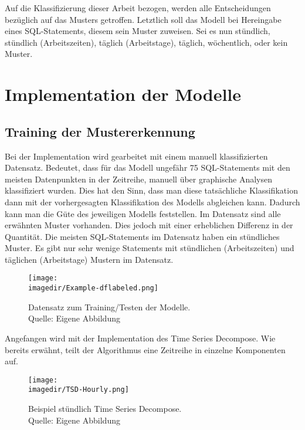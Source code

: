  Auf die Klassifizierung dieser Arbeit bezogen, werden alle Entscheidungen bezüglich auf das Musters getroffen. Letztlich soll das Modell bei Hereingabe eines SQL-Statements, diesem sein Muster zuweisen. Sei es nun stündlich, stündlich (Arbeitszeiten), täglich (Arbeitstage), täglich, wöchentlich, oder kein Muster.

\section{Implementation der Modelle}

\subsection{Training der Mustererkennung}

Bei der Implementation wird gearbeitet mit einem manuell klassifizierten Datensatz. Bedeutet, dass für das Modell ungefähr 75 SQL-Statements mit den meisten Datenpunkten in der Zeitreihe, manuell über graphische Analysen klassifiziert wurden. Dies hat den Sinn, dass man diese tatsächliche Klassifikation dann mit der vorhergesagten Klassifikation des Modells abgleichen kann. Dadurch kann man die Güte des jeweiligen Modells feststellen. Im Datensatz sind alle erwähnten Muster vorhanden. Dies jedoch mit einer erheblichen Differenz in der Quantität. Die meisten SQL-Statements im Datensatz haben ein stündliches Muster. Es gibt nur sehr wenige Statements mit stündlichen (Arbeitszeiten) und täglichen (Arbeitstage) Mustern im Datensatz.

\begin{figure}[H]

	\centering
	\texttt{[image: \\imagedir/Example-dflabeled.png]}
	\captionsetup{format=hang}
	\caption[Datensatz zum Training/Testen der Modelle]{\label{fig:test}Datensatz zum Training/Testen der Modelle. \\Quelle: Eigene Abbildung}
\end{figure}

Angefangen wird mit der Implementation des Time Series Decompose. Wie bereits erwähnt, teilt der Algorithmus eine Zeitreihe in einzelne Komponenten auf.

\begin{figure}[H]

	\centering
	\texttt{[image: \\imagedir/TSD-Hourly.png]}
	\captionsetup{format=hang}
	\caption[Beispiel stündlich Time Series Decompose]{\label{fig:test}Beispiel stündlich Time Series Decompose. \\Quelle: Eigene Abbildung}

\end{figure}

